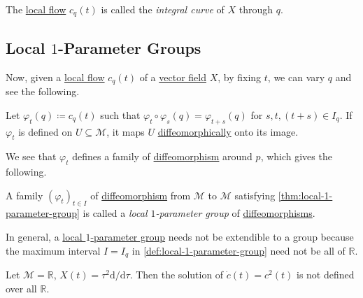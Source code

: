 \begin{center}
\end{center}

\begin{definition}\label{def:integral-curve}
	The \hyperref[def:local-flow]{local flow} \(c_q(t)\) is called the \emph{integral curve} of \(X\) through \(q\).
\end{definition}

\subsection{Local \(1\)-Parameter Groups}
Now, given a \hyperref[def:local-flow]{local flow} \(c_q(t)\) of a \hyperref[def:vector-field]{vector field} \(X\), by fixing \(t\), we can vary \(q\) and see the following.

\begin{theorem}\label{thm:local-1-parameter-group}
	Let \(\varphi _t(q) \coloneqq c_q(t)\) such that \(\varphi _t \circ \varphi _s(q) = \varphi _{t+s}(q)\) for \(s, t, (t+s)\in I_q\). If \(\varphi _t\) is defined on \(U \subseteq \mathcal{M} \), it maps \(U\) \hyperref[def:diffeomorphic]{diffeomorphically} onto its image.
\end{theorem}

We see that \(\varphi _t\) defines a family of \hyperref[def:diffeomorphism]{diffeomorphism} around \(p\), which gives the following.

\begin{definition}\label{def:local-1-parameter-group}
	A family \((\varphi _t)_{t\in I}\) of \hyperref[def:diffeomorphism]{diffeomorphism} from \(\mathcal{M} \) to \(\mathcal{M} \) satisfying \autoref{thm:local-1-parameter-group} is called a \emph{local \(1\)-parameter group} of \hyperref[def:diffeomorphism]{diffeomorphisms}.
\end{definition}

In general, a \hyperref[def:local-1-parameter-group]{local \(1\)-parameter group} needs not be extendible to a group because the maximum interval \(I = I_q\) in \autoref{def:local-1-parameter-group} need not be all of \(\mathbb{R} \).

\begin{eg}
	Let \(\mathcal{M} = \mathbb{R} \), \(X(t) = \tau ^2 \mathrm{d} / \mathrm{d} \tau \). Then the solution of \(\dot{c}(t) = c^2(t)\) is not defined over all \(\mathbb{R} \).
\end{eg}

